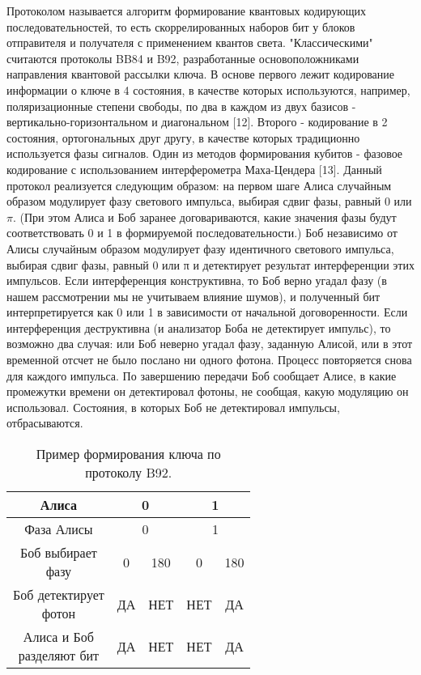 Протоколом называется алгоритм формирование квантовых кодирующих последовательностей, то есть скоррелированных наборов бит у блоков отправителя и получателя с применением квантов света. "Классическими"  считаются протоколы BB84 и B92, разработанные основоположниками направления квантовой рассылки ключа. В основе первого лежит кодирование информации о ключе в 4 состояния, в качестве которых используются, например, поляризационные степени свободы, по два в каждом из двух базисов - вертикально-горизонтальном и диагональном [12]. Второго - кодирование в 2 состояния,  ортогональных друг другу, в качестве которых традиционно используется фазы сигналов. Один из методов формирования кубитов - фазовое кодирование с использованием интерферометра Маха-Цендера [13]. Данный протокол реализуется следующим образом: на первом шаге Алиса случайным образом модулирует фазу светового импульса, выбирая сдвиг фазы, равный 0 или $\pi$. (При этом Алиса и Боб заранее договариваются, какие значения фазы будут соответствовать 0 и 1 в формируемой последовательности.) Боб независимо от Алисы случайным образом модулирует фазу идентичного светового импульса, выбирая сдвиг фазы, равный 0 или π и детектирует результат интерференции этих импульсов. Если интерференция конструктивна, то Боб верно угадал фазу (в нашем рассмотрении мы не учитываем влияние шумов), и полученный бит интерпретируется как 0 или 1 в зависимости от начальной договоренности. Если интерференция деструктивна (и анализатор Боба не детектирует импульс), то возможно два случая: или Боб неверно угадал фазу, заданную Алисой, или в этот временной отсчет не было послано ни одного фотона. Процесс повторяется снова для каждого импульса. По завершению передачи Боб сообщает Алисе, в какие промежутки времени он детектировал фотоны, не сообщая, какую модуляцию он использовал. Состояния, в которых Боб не детектировал импульсы, отбрасываются.


\begin{table} [htbp]
	\centering
	\caption{Пример формирования ключа по протоколу B92.}
	\label{tab:protocol}
	\begin{tabular}{| c | c | c | c | c |}
	 \hline	Алиса                              & \multicolumn{2}{|c|}{0}   & \multicolumn{2}{|c|}{1}   \\ \hline
	  Фаза Алисы					     	   & \multicolumn{2}{|c|}{0}   & \multicolumn{2}{|c|}{1}   \\ \hline
	  \makecell{Боб выбирает \\ фазу}	    	   & 0      	                   & 180    & 0 	& 180      \\ \hline
	  \makecell{Боб детектирует \\ фотон}      & ДА                        & НЕТ    & НЕТ   & ДА       \\ \hline
	  \makecell{Алиса и Боб \\ разделяют бит}  & ДА                        & НЕТ    & НЕТ   & ДА       \\ \hline
	\end{tabular}%
\end{table}


